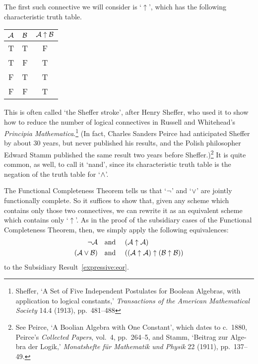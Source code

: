 The first such connective we will consider is `$\uparrow$', which has the following characteristic truth table.
\begin{center}
\begin{tabular}{c c | c}
$\mathcal{A}$ & $\mathcal{B}$ & $\mathcal{A} \mathrel{\uparrow} \mathcal{B}$\\
\hline
 T & T & F \\
 T & F & T \\
 F & T & T  \\
 F & F & T
\end{tabular}
\end{center}
 This is often called `the Sheffer stroke', after Henry Sheffer, who used it to show how to reduce the number of logical connectives in Russell and Whitehead's \textit{Principia Mathematica}.\footnote{Sheffer, `A Set of Five Independent Postulates for Boolean Algebras, with application to logical constants,' \textit{Transactions of the American Mathematical Society} 14.4 (1913), pp.~481--488} (In fact, Charles Sanders Peirce had anticipated Sheffer by about 30 years, but never published his results, and the Polish philosopher Edward Stamm published the same result two years before Sheffer.)\footnote{See Peirce, `A Boolian Algebra with One Constant', which dates to c.~1880, Peirce's \textit{Collected Papers}, vol.~4, pp.~264--5, and Stamm, `\foreignlanguage{german}{Beitrag zur Algebra der Logik},' \foreignlanguage{german}{\textit{Monatshefte für Mathematik und Physik}} 22 (1911), pp.~137--49.} It is quite common, as well, to call it `nand', since its characteristic truth table is the negation of the truth table for `$\wedge$'.

The Functional Completeness Theorem tells us that `$\neg$' and `$\vee$' are jointly functionally complete. So it suffices to show that, given any scheme which contains only those two connectives, we can rewrite it as an equivalent scheme which contains only `$\uparrow$'. As in the proof of the subsidiary cases of the Functional Completeness Theorem, then, we simply apply the following equivalences:
		\begin{align*}
			\neg \mathcal{A} &\text{\quad and \quad} (\mathcal{A} \uparrow \mathcal{A})\\
			(\mathcal{A} \vee \mathcal{B}) & \text{\quad and \quad} ((\mathcal{A} \uparrow \mathcal{A}) \uparrow (\mathcal{B} \uparrow \mathcal{B}))
		\end{align*}
to the Subsidiary Result~\ref{expressive:eor}.

